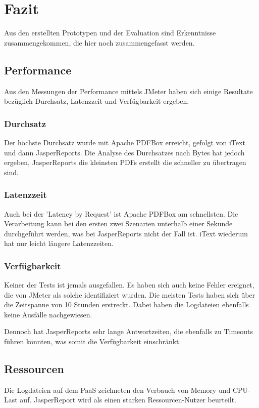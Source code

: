 \documentclass[main.tex]{subfiles}
\begin{document}
\chapter{Fazit}

Aus den erstellten Prototypen und der Evaluation sind Erkenntnisse zusammengekommen, die hier noch zusammengefasst werden. 


\section{Performance}
Aus den Messungen der Performance mittels JMeter haben sich einige Resultate  bezüglich Durchsatz, Latenzzeit und Verfügbarkeit ergeben.


\subsection{Durchsatz}

Der höchste Durchsatz wurde mit Apache PDFBox erreicht, gefolgt von iText und dann JasperReports. Die Analyse des Durchsatzes nach Bytes hat jedoch ergeben, JasperReports die kleinsten PDFs erstellt die schneller zu übertragen sind. 

\subsection{Latenzzeit}
Auch bei der 'Latency by Request' ist Apache PDFBox am schnellsten. Die Verarbeitung kann bei den ersten zwei Szenarien unterhalb einer Sekunde durchgeführt werden, was bei JasperReports nicht der Fall ist. iText wiederum hat nur leicht längere Latenzzeiten.

\subsection{Verfügbarkeit}

Keiner der Tests ist jemals ausgefallen. Es haben sich auch keine Fehler ereignet, die von JMeter als solche identifiziert wurden. Die meisten Tests haben sich über die Zeitspanne von 10 Stunden erstreckt. Dabei haben die Logdateien ebenfalls keine Ausfälle nachgewiesen.

Dennoch hat JasperReports sehr lange Antwortzeiten, die ebenfalls zu Timeouts führen könnten, was somit die Verfügbarkeit einschränkt.


\section{Ressourcen}
Die Logdateien auf dem PaaS zeichneten den Verbauch von Memory und CPU-Last auf. JasperReport wird als einen starken Ressourcen-Nutzer beurteilt.  
\end{document}
